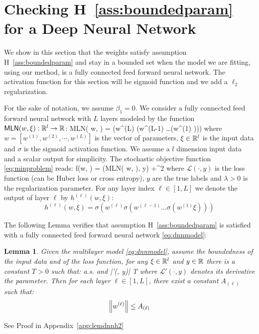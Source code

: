 \documentclass[11pt]{article}
\newtheorem{Lemma}{Lemma}
\theoremstyle{k}
\begin{document}
\section{Checking H~\ref{ass:boundedparam} for a Deep Neural Network}
We show in this section that the weights satisfy assumption H~\ref{ass:boundedparam} and stay in a bounded set when the model we are fitting, using our method, is a fully connected feed forward neural network. 
The activation function for this section will be sigmoid function and we add a $\ell_2$ regularization. 

For the sake of notation, we assume $\beta_1 = 0$.
We consider a fully connected feed forward neural network with $L$ layers modeled by the function $\textsf{MLN}(w, \xi): \mathbb{R}^l \to \mathbb{R}$:
\beq\label{eq:dnnmodel}
\textsf{MLN}( w, \xi) = \sigma\left(w^{(L)} \sigma\left(w^{(L-1)} \ldots \sigma\left(w^{(1)} \xi \right)\right)\right)
\eeq
where $w = [w^{(1)}, w^{(2)}, \cdots , w^{(L)}]$ is the vector of parameters, $\xi \in \mathbb{R}^l$ is the input data and $\sigma$ is the sigmoid activation function. We assume a $l$ dimension input data and a scalar output for simplicity.
The stochastic objective function \eqref{eq:minproblem} reads:
\beq\label{eq:lossmln}
f(w, \xi) = (\textsf{MLN}( w, \xi), y) +^2
\eeq
where $\mathcal{L}(\cdot, y)$ is the loss function (can be Huber loss or cross entropy), $y$ are the true labels and $\lambda >0$ is the regularization parameter.
For any layer index $\ell \in [1, L]$ we denote the output of layer $\ell$ by $h^{(\ell)}(w,\xi)$:
$$
h^{(\ell)}(w,\xi) = \sigma\left(w^{(\ell)} \sigma\left(w^{(\ell-1)} \ldots \sigma\left(w^{(1)} \xi \right)\right)\right)
$$

The following Lemma verifies that assumption H~\ref{ass:boundedparam} is satisfied with a fully connected feed forward neural network \eqref{eq:dnnmodel}:
\begin{Lemma}\label{lem:dnnh2} 
Given the multilayer model \eqref{eq:dnnmodel}, assume the boundedness of the input data and of the loss function, \ie for any $\xi \in \mathbb{R}^l$ and $y \in \mathbb{R}$ there is a constant $T >0$ such that:
\beq\label{eq:mildassumptions}
\norm{\xi}  \quad \textrm{a.s.} \quad \textrm{and} |'(\cdot, y)| \leq T
\eeq
where $\mathcal{L}'(\cdot, y)$ denotes its derivative \wrt the parameter. Then for each layer $\ell \in [1,L]$, there exist a constant $A_{(\ell)}$ such that:
$$
\left\Vert w^{(\ell)} \right\Vert \leq A_{(\ell)}
$$
\end{Lemma}
See Proof in Appendix~\ref{app:lemdnnh2}
\end{document}
